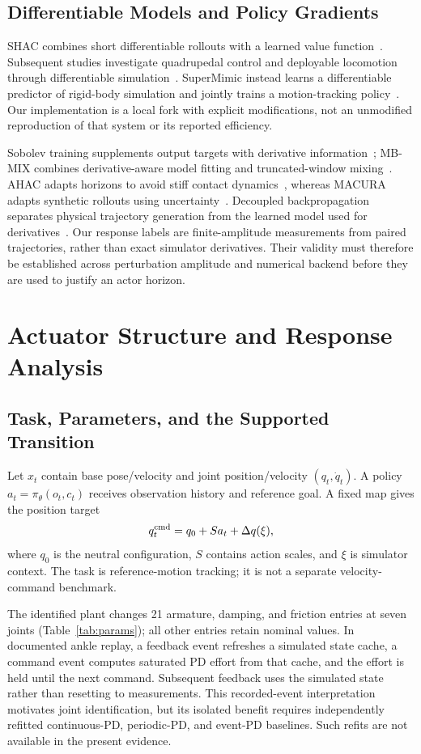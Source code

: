 \subsection{Differentiable Models and Policy Gradients}
SHAC combines short differentiable rollouts with a learned value function~\cite{shac}. Subsequent studies investigate quadrupedal control and deployable locomotion through differentiable simulation~\cite{song,schwarke}. SuperMimic instead learns a differentiable predictor of rigid-body simulation and jointly trains a motion-tracking policy~\cite{supermimic}. Our implementation is a local fork with explicit modifications, not an unmodified reproduction of that system or its reported efficiency.

Sobolev training supplements output targets with derivative information~\cite{sobolev}; MB-MIX combines derivative-aware model fitting and truncated-window mixing~\cite{mbmix}. AHAC adapts horizons to avoid stiff contact dynamics~\cite{ahac}, whereas MACURA adapts synthetic rollouts using uncertainty~\cite{macura}. Decoupled backpropagation separates physical trajectory generation from the learned model used for derivatives~\cite{dmo}. Our response labels are finite-amplitude measurements from paired trajectories, rather than exact simulator derivatives. Their validity must therefore be established across perturbation amplitude and numerical backend before they are used to justify an actor horizon.

\section{Actuator Structure and Response Analysis}
\subsection{Task, Parameters, and the Supported Transition}
Let $x_t$ contain base pose/velocity and joint position/velocity $(q_t,\dot q_t)$. A policy $a_t=\pi_\theta(o_t,c_t)$ receives observation history and reference goal. A fixed map gives the position target
\begin{equation}
q^{\mathrm{cmd}}_t=q_0+Sa_t+\Delta q(\xi),
\label{eq:target}
\end{equation}
where $q_0$ is the neutral configuration, $S$ contains action scales, and $\xi$ is simulator context. The task is reference-motion tracking; it is not a separate velocity-command benchmark.

The identified plant changes 21 armature, damping, and friction entries at seven joints (Table~\ref{tab:params}); all other entries retain nominal values. In documented ankle replay, a feedback event refreshes a simulated state cache, a command event computes saturated PD effort from that cache, and the effort is held until the next command. Subsequent feedback uses the simulated state rather than resetting to measurements. This recorded-event interpretation motivates joint identification, but its isolated benefit requires independently refitted continuous-PD, periodic-PD, and event-PD baselines. Such refits are not available in the present evidence.

